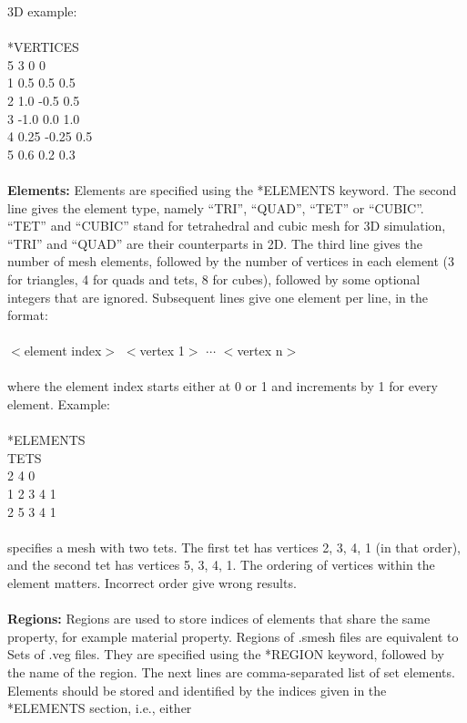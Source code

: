 \documentclass[11pt,fullpage]{article}
\begin{document}
\noindent{}3D example:
\\\\
\noindent{}*VERTICES\\
5 3 0 0\\
1 0.5 0.5 0.5\\
2 1.0 -0.5 0.5\\
3 -1.0 0.0 1.0\\
4 0.25 -0.25 0.5\\
5 0.6 0.2 0.3
\\\\
\noindent{}\textbf{Elements:} Elements are specified using the
*ELEMENTS keyword. The second line gives the element type, namely
``TRI'', ``QUAD'', ``TET'' or ``CUBIC''. ``TET'' and ``CUBIC'' stand
for tetrahedral and cubic mesh for 3D simulation, ``TRI'' and ``QUAD''
are their counterparts in 2D. The third line gives the
number of mesh elements, followed by the number of vertices in each
element (3 for triangles, 4 for quads and tets, 8 for cubes), followed
by some optional integers that are ignored. Subsequent lines give one
element per line, in the format:
\\\\
\noindent{}$<$element index$>$ $<$vertex 1$>$ $\cdots$ $<$vertex n$>$
\\\\
\noindent{}where the element index starts either at 0 or 1 and
increments by 1 for every element. Example:
\\\\
\noindent{}*ELEMENTS\\
TETS\\
2 4 0\\
1 2 3 4 1\\
2 5 3 4 1
\\\\
\noindent{} specifies a mesh with two tets. The first tet has vertices
2, 3, 4, 1 (in that order), and the second tet has vertices 5, 3, 4,
1. The ordering of vertices within the element matters. Incorrect
order give wrong results.
\\\\
\noindent{}\textbf{Regions:} Regions are used to store indices of elements that share the same property,
for example material property. Regions of .smesh files are equivalent to
Sets of .veg files. They are specified using the *REGION
keyword, followed by the name of the region. The next lines are
comma-separated list of set elements. Elements should be stored and
identified by the indices given in the *ELEMENTS section, i.e., either
\end{document}
